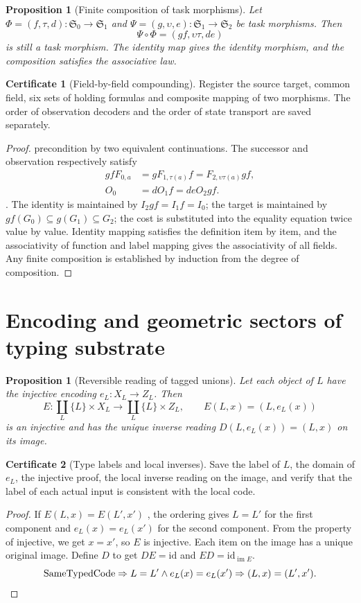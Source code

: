 \documentclass[12pt,a4paper,openany,notitlepage]{report}
\theoremstyle{plain}
\newtheorem{proposition}[theorem]{Proposition}
\theoremstyle{definition}
\newtheorem*{certificate}{Certificate}
\theoremstyle{remark}
\begin{document}
\begin{CJK*}
\begin{proposition}
[Finite composition of task morphisms]\label{exp:law:composition}
Let $\Phi=(f,\tau,d):\mathfrak S_0\to\mathfrak S_1$ and $\Psi=(g,\upsilon,e):\mathfrak S_1\to\mathfrak S_2$ be task morphisms. Then \[
 \Psi\circ\Phi=(gf,\upsilon\tau,de)
\] is still a task morphism. The identity map gives the identity morphism, and the composition satisfies the associative law.\end{proposition}
\begin{certificate}
[Field-by-field compounding]Register the source target, common field, six sets of holding formulas and composite mapping of two morphisms. The order of observation decoders and the order of state transport are saved separately.\end{certificate}
\begin{proof}
precondition by two equivalent continuations. The successor and observation respectively satisfy \[
 \begin{aligned}
 gfF_{0,a}&=gF_{1,\tau(a)}f
 =F_{2,\upsilon\tau(a)}gf,\\
 O_0&=dO_1f=deO_2gf.
 \end{aligned}
\]. The identity is maintained by $I_2gf=I_1f=I_0$; the target is maintained by $gf(G_0)\subseteq g(G_1)\subseteq G_2$; the cost is substituted into the equality equation twice value by value. Identity mapping satisfies the definition item by item, and the associativity of function and label mapping gives the associativity of all fields. Any finite composition is established by induction from the degree of composition.\end{proof}


\section { Encoding and geometric sectors of typing substrate }

\begin{proposition}
[Reversible reading of tagged unions]\label{exp:law:typed-union}
Let each object of $L$ have the injective encoding $e_L:X_L\to Z_L$. Then \[
 E:\coprod_L\{L\}\times X_L\longrightarrow
   \coprod_L\{L\}\times Z_L,
 \qquad E(L,x)=(L,e_L(x))
\] is an injective and has the unique inverse reading $D(L,e_L(x))=(L,x)$ on its image.\end{proposition}
\begin{certificate}
[Type labels and local inverses]Save the label of $L$, the domain of $e_L$, the injective proof, the local inverse reading on the image, and verify that the label of each actual input is consistent with the local code.\end{certificate}
\begin{proof}
If $E(L,x)=E(L',x')$ , the ordering gives $L=L'$ for the first component and $e_L(x)=e_L(x')$ for the second component. From the property of injective, we get $x=x'$, so $E$ is injective. Each item on the image has a unique original image. Define $D$ to get $DE=\mathrm{id}$ and $ED=\mathrm{id}_{\operatorname{im}E}$. \[
 \operatorname{SameTypedCode}
 \Rightarrow L=L'\land e_L(x)=e_L(x')
 \Rightarrow(L,x)=(L',x').\qedhere
\]\end{proof}



\end{CJK*}
\end{document}
